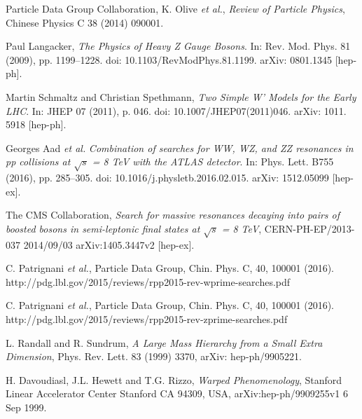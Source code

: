 \documentclass[UKenglish,texlive=2013]{\ATLASLATEXPATH atlasdoc}
\newcommand{\cme}{\sqrt{s}}
\begin{document}





\begin{thebibliography}{9}

  Particle Data Group Collaboration, K. Olive \emph{et al.},
  \emph{ Review of Particle Physics},
Chinese Physics C 38 (2014) 090001.

Paul Langacker,
\emph{The Physics of Heavy
Z Gauge Bosons}. In: Rev. Mod. Phys.
81 (2009), pp. 1199–1228. doi: 10.1103/RevModPhys.81.1199. arXiv: 0801.1345
[hep-ph].

Martin Schmaltz and Christian Spethmann,
\emph{Two Simple W’ Models for the Early
LHC}. In: JHEP 07 (2011), p. 046. doi: 10.1007/JHEP07(2011)046. arXiv: 1011.
5918 [hep-ph].

Georges Aad \emph{et al.}
\emph{Combination of searches for WW, WZ, and ZZ resonances
in pp collisions at $\sqrt{s}$ = 8 TeV with the ATLAS detector}. In: Phys. Lett. B755
(2016), pp. 285–305. doi: 10.1016/j.physletb.2016.02.015. arXiv: 1512.05099
[hep-ex].

The CMS Collaboration,
\emph{Search for massive resonances decaying into pairs of boosted bosons in semi-leptonic final states at $\cme$ = 8 TeV},
CERN-PH-EP/2013-037
2014/09/03
arXiv:1405.3447v2 [hep-ex].

C. Patrignani \emph{et al.},
Particle Data Group, Chin. Phys. C, 40, 100001 (2016).
http://pdg.lbl.gov/2015/reviews/rpp2015-rev-wprime-searches.pdf

C. Patrignani \emph{et al.},
Particle Data Group, Chin. Phys. C, 40, 100001 (2016).
http://pdg.lbl.gov/2015/reviews/rpp2015-rev-zprime-searches.pdf

L. Randall and R. Sundrum,
\emph{A Large Mass Hierarchy from a Small Extra Dimension},
Phys. Rev. Lett. 83 (1999) 3370, arXiv: hep-ph/9905221.

H. Davoudiasl, J.L. Hewett and T.G. Rizzo,
\emph{Warped Phenomenology},
Stanford Linear Accelerator Center
Stanford CA 94309, USA,
arXiv:hep-ph/9909255v1 6 Sep 1999.


\end{thebibliography}
\end{document}

